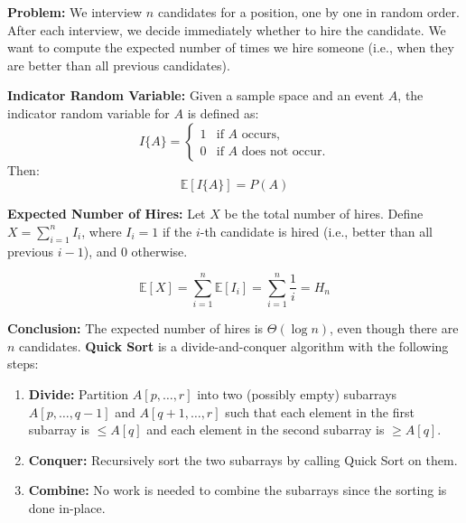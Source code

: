 \documentclass[a4paper,landscape]{article}
\begin{document}
\begin{multicols}{7}
\tcolorbox[mybox={The Hiring Problem}]
\textbf{Problem:} We interview $n$ candidates for a position, one by one in random order. After each interview, we decide immediately whether to hire the candidate. We want to compute the expected number of times we hire someone (i.e., when they are better than all previous candidates).


\textbf{Indicator Random Variable:}  
Given a sample space and an event $A$, the indicator random variable for $A$ is defined as:
\[
I\{A\} =
\begin{cases}
    1 & \text{if } A \text{ occurs}, \\
    0 & \text{if } A \text{ does not occur}.
\end{cases}
\]
Then:  
\[
\mathbb{E}[I\{A\}] = P(A)
\]


\textbf{Expected Number of Hires:}  
Let $X$ be the total number of hires. Define $X = \sum_{i=1}^n I_i$, where $I_i = 1$ if the $i$-th candidate is hired (i.e., better than all previous $i - 1$), and 0 otherwise.

\[
\mathbb{E}[X] = \sum_{i=1}^n \mathbb{E}[I_i] = \sum_{i=1}^n \frac{1}{i} = H_n
\]


\textbf{Conclusion:}  
The expected number of hires is $\Theta(\log n)$, even though there are $n$ candidates.
\endtcolorbox
\tcolorbox[mybox={Quick Sort}]
\textbf{Quick Sort} is a divide-and-conquer algorithm with the following steps:

\begin{enumerate}[noitemsep, topsep=0pt]
    \item \textbf{Divide:} Partition $A[p, \dots, r]$ into two (possibly empty) subarrays $A[p, \dots, q-1]$ and $A[q+1, \dots, r]$ such that each element in the first subarray is $\leq A[q]$ and each element in the second subarray is $\geq A[q]$.
    \item \textbf{Conquer:} Recursively sort the two subarrays by calling Quick Sort on them.
    \item \textbf{Combine:} No work is needed to combine the subarrays since the sorting is done in-place.
\end{enumerate}

\noindent %


\end{multicols}
\end{document}
